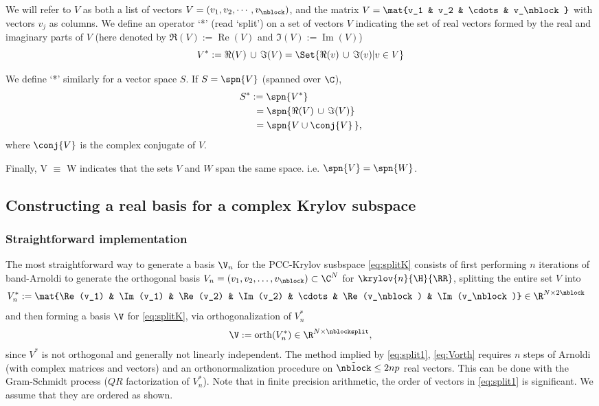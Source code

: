 \bigskip
\begin{notation} We will refer to $V$ as both a list of vectors $V = (v_1, v_2, \cdots,v_\nblock)$,
and the matrix $V=\mat{v_1 & v_2 & \cdots & v_\nblock}$ with vectors $v_j$ as columns.
We define an operator `*' (read `split') on a set of vectors $V$ indicating the set of real
vectors formed by the real and imaginary parts of $V$
(here denoted by  $\Re(V):=\operatorname{Re}(V)$ and $\Im(V):= \operatorname{Im}(V)$)
\[
V^* :=  \Re(V) \,\cup\, \Im(V) = \Set{ \Re(v) \,\cup\, \Im(v) | v\in V}
\]

We define `*' similarly for a vector space $S$.  If $S = \spn{V}$ (spanned over $\C$),
\begin{align*}
	S^* &:= \spn{V^*} \\
	&\ = \spn{\Re(V) \,\cup\, \Im(V)} \\
	&\ = \spn{V \cup \conj{V}\,},
\end{align*}
where $\conj{V}$ is the complex conjugate of $V$.

Finally, V $\equiv$ W indicates that the sets $V$ and $W$ span the same space. i.e.
$\spn{V} = \spn{W}$.
\end{notation}
\bigskip




\subsection{Constructing a real basis for a complex Krylov subspace}
\label{sec:makingrealbasis}

\subsubsection{Straightforward implementation}\label{sec:naive}
The most straightforward way to generate a basis $\V_n$ for the PCC-Krylov susbspace
\eqref{eq:splitK}
 consists of first performing $n$ iterations of band-Arnoldi to generate the orthogonal basis
 $V_n = (v_1 , v_2 , \ldots , v_\nblock)\subset \C^{N}$ for $\krylov{n}{\H}{\RR}$,
 splitting the entire set $V$ into
 \begin{align}
  V_n^* &:= \mat{\Re(v_1) & \Im(v_1) & \Re(v_2) & \Im(v_2) & \cdots & \Re(v_\nblock) & \Im(v_\nblock)}
  \in \R^{N \times 2\nblock}
 \label{eq:split1}
 \end{align}
 and then forming a basis $\V$ for \eqref{eq:splitK}, via orthogonalization
 of $V_n^*$
 \begin{equation}
  	\V := \text{orth}(V_n^*) \in \R^{N \times \nblocksplit},
  	\label{eq:Vorth}
 \end{equation}
 since $V^*$ is not orthogonal and generally not linearly independent.  The method
 implied by \eqref{eq:split1}, \eqref{eq:Vorth} requires
 $n$ steps of Arnoldi (with complex matrices and vectors)
 and an orthonormalization procedure on $\tilde{\nblock}\leq 2np$ real vectors.  This can be
 done with the Gram-Schmidt process ($QR$ factorization of $V_n^*$). Note that in finite precision
 arithmetic, the order of vectors in \eqref{eq:split1} is significant.  We assume that
 they are ordered as shown.

